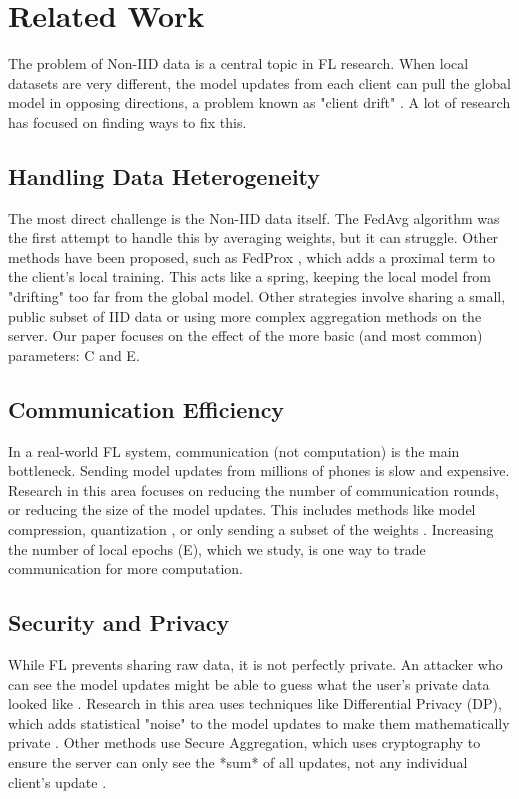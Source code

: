 \documentclass[conference]{IEEEtran}
\begin{document}
\section{Related Work}
The problem of Non-IID data is a central topic in FL research. When local datasets are very different, the model updates from each client can pull the global model in opposing directions, a problem known as "client drift" \cite{b4, b5}. A lot of research has focused on finding ways to fix this.

\subsection{Handling Data Heterogeneity}
The most direct challenge is the Non-IID data itself. The FedAvg algorithm \cite{b2} was the first attempt to handle this by averaging weights, but it can struggle. Other methods have been proposed, such as FedProx \cite{b6}, which adds a proximal term to the client's local training. This acts like a spring, keeping the local model from "drifting" too far from the global model. Other strategies involve sharing a small, public subset of IID data \cite{b7} or using more complex aggregation methods on the server. Our paper focuses on the effect of the more basic (and most common) parameters: C and E.

\subsection{Communication Efficiency}
In a real-world FL system, communication (not computation) is the main bottleneck. Sending model updates from millions of phones is slow and expensive. Research in this area focuses on reducing the number of communication rounds, or reducing the size of the model updates. This includes methods like model compression, quantization \cite{b8}, or only sending a subset of the weights \cite{b9}. Increasing the number of local epochs (E), which we study, is one way to trade communication for more computation.

\subsection{Security and Privacy}
While FL prevents sharing raw data, it is not perfectly private. An attacker who can see the model updates might be able to guess what the user's private data looked like \cite{b10}. Research in this area uses techniques like Differential Privacy (DP), which adds statistical "noise" to the model updates to make them mathematically private \cite{b11}. Other methods use Secure Aggregation, which uses cryptography to ensure the server can only see the *sum* of all updates, not any individual client's update \cite{b12}.
\end{document}
